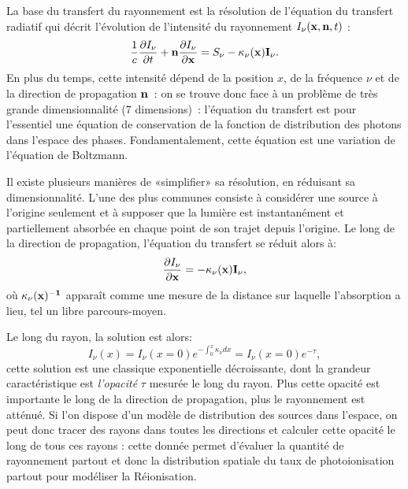 La base du transfert du rayonnement est la résolution de l'équation du transfert radiatif qui décrit l'évolution de l'intensité du rayonnement $I_\nu({\bf x},{\bf n} ,t)$ :
\begin{equation}
\frac{1}{c}\frac{\partial I_\nu}{\partial t}+{\bf n} \frac{\partial I_\nu}{\partial {\bf x}}=S_\nu - \kappa_\nu(\bf x) I_\nu.
\end{equation}
En plus du temps, cette intensité dépend de la position $x$, de la fréquence $\nu$ et de la direction de propagation $\bf n$~: on se trouve donc face à un problème de très grande dimensionnalité (7 dimensions)~: l'équation du transfert est pour l'essentiel une équation de conservation de la fonction de distribution des photons dans l'espace des phases. Fondamentalement, cette équation est une variation de l'équation de Boltzmann.

Il existe plusieurs manières de «simplifier» sa résolution, en réduisant sa dimensionnalité. L'une des plus communes consiste à considérer une source à l'origine seulement et à supposer que la lumière est instantanément et partiellement absorbée en chaque point de son trajet depuis l'origine. Le long de la direction de propagation, l'équation du transfert se réduit alors à:
\begin{equation}
 \frac{\partial I_\nu}{\partial {\bf x}}=- \kappa_\nu(\bf x) I_\nu,
\end{equation}
où $\kappa_\nu(\bf x)^{-1}$ apparaît comme une mesure de la distance sur laquelle l'absorption a lieu, tel un libre parcours-moyen.

Le long du rayon, la solution est alors:
\begin{equation}
I_\nu(x)=I_\nu(x=0)e^{-\int_0^x \kappa_\nu dx}=I_\nu(x=0)e^{-\tau},
\end{equation}
cette solution est une classique exponentielle décroissante, dont la grandeur caractéristique est \textit{l'opacité} $\tau$ mesurée le long du rayon. Plus cette opacité est importante le long de la direction de propagation, plus le rayonnement est atténué. Si l’on dispose d'un modèle de distribution des sources dans l'espace, on peut donc tracer des rayons dans toutes les directions et calculer cette opacité le long de tous ces rayons : cette donnée permet d'évaluer la quantité de rayonnement partout et donc la distribution spatiale du taux de photoionisation partout pour modéliser la Réionisation.

